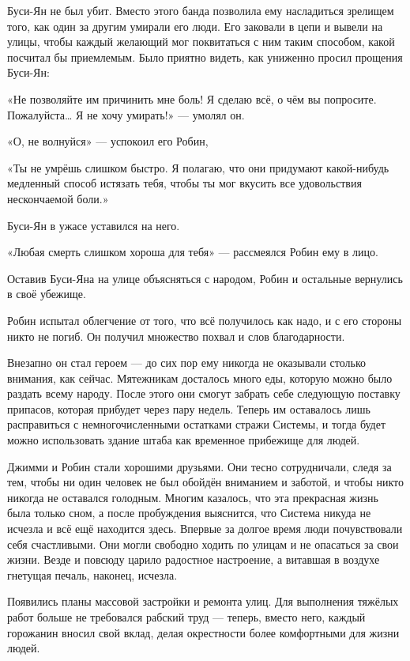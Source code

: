 \documentclass[a4paper,12pt]{book}
\begin{document}
\par
Буси-Ян не был убит. Вместо этого банда позволила ему насладиться зрелищем того, как один за другим умирали его люди. Его заковали в цепи и вывели на улицы, чтобы каждый желающий мог поквитаться с ним таким способом, какой посчитал бы приемлемым. Было приятно видеть, как униженно просил прощения Буси-Ян:
\par
«Не позволяйте им причинить мне боль! Я сделаю всё, о чём вы попросите. Пожалуйста… Я не хочу умирать!» — умолял он.
\par
«О, не волнуйся» — успокоил его Робин,
\par
«Ты не умрёшь слишком быстро. Я полагаю, что они придумают какой-нибудь медленный способ истязать тебя, чтобы ты мог вкусить все удовольствия нескончаемой боли.»
\par
Буси-Ян в ужасе уставился на него.
\par
«Любая смерть слишком хороша для тебя» — рассмеялся Робин ему в лицо.
\par
Оставив Буси-Яна на улице объясняться с народом, Робин и остальные вернулись в своё убежище.
\par
Робин испытал облегчение от того, что всё получилось как надо, и с его стороны никто не погиб. Он получил множество похвал и слов благодарности.
\par
Внезапно он стал героем — до сих пор ему никогда не оказывали столько внимания, как сейчас. Мятежникам досталось много еды, которую можно было раздать всему народу. После этого они смогут забрать себе следующую поставку припасов, которая прибудет через пару недель. Теперь им оставалось лишь расправиться с немногочисленными остатками стражи Системы, и тогда будет можно использовать здание штаба как временное прибежище для людей.\\
\par
Джимми и Робин стали хорошими друзьями. Они тесно сотрудничали, следя за тем, чтобы ни один человек не был обойдён вниманием и заботой, и чтобы никто никогда не оставался голодным. Многим казалось, что эта прекрасная жизнь была только сном, а после пробуждения выяснится, что Система никуда не исчезла и всё ещё находится здесь. Впервые за долгое время люди почувствовали себя счастливыми. Они могли свободно ходить по улицам и не опасаться за свои жизни. Везде и повсюду царило радостное настроение, а витавшая в воздухе гнетущая печаль, наконец, исчезла.
\par
Появились планы массовой застройки и ремонта улиц. Для выполнения тяжёлых работ больше не требовался рабский труд — теперь, вместо него, каждый горожанин вносил свой вклад, делая окрестности более комфортными для жизни людей.\\
\end{document}
